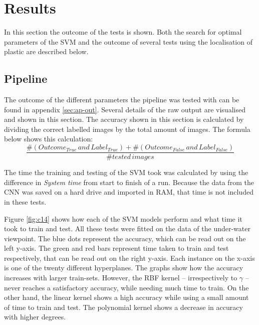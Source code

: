 \section{Results}
\label{sec:Results}
In this section the outcome of the tests is shown.
Both the search for optimal parameters of the SVM and the outcome of several tests using the localisation of plastic are described below.




\subsection{Pipeline}
\label{sec:Results-SVM}
The outcome of the different parameters the pipeline was tested with can be found in appendix \ref{sec:ap-out}.
Several details of the raw output are visualised and shown in this section.
The accuracy shown in this section is calculated by dividing the correct labelled images by the total amount of images. The formula below shows this calculation:
\[
\frac{\#(Outcome_{True}\,and\,Label_{True})+\#(Outcome_{False}\,and\,Label_{False})}{\#tested\,images}
\]

The time the training and testing of the SVM took was calculated by using the difference in \textit{System time} from start to finish of a run.
Because the data from the CNN was saved on a hard drive and imported in RAM, that time is not included in these tests.

Figure \ref{fig:c14} shows how each of the SVM models perform and what time it took to train and test.
All these tests were fitted on the data of the under-water viewpoint.
The blue dots represent the accuracy, which can be read out on the left y-axis.
The green and red bars represent time taken to train and test respectively, that can be read out on the right y-axis.
Each instance on the x-axis is one of the twenty different hyperplanes.
The graphs show how the accuracy increases with larger train-sets. However, the RBF kernel -- irrespectively to $\gamma$ -- never reaches a satisfactory accuracy, while needing much time to train. On the other hand, the linear kernel shows a high accuracy while using a small amount of time to train and test. The polynomial kernel shows a decrease in accuracy with higher degrees.

